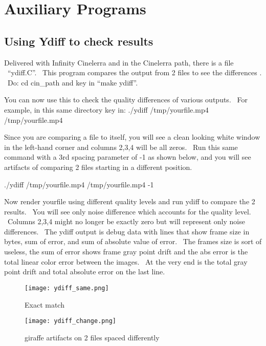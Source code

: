 \chapter{Auxiliary Programs}%
\label{cha:auxiliary_programs}
\section{Using Ydiff to check results}
\label{sec:Ydiff to check results}

Delivered with Infinity Cinelerra and in the Cinelerra path, there is a file \ {}``ydiff.C''. \ This program compares the output from 2 files to see the differences . \ Do: cd cin\_path and key in ``make ydiff''. 
\medskip

You can now use this to check the quality differences of various outputs. \ For example, in this same directory key in:
\hspace{2em}./ydiff /tmp/yourfile.mp4 /tmp/yourfile.mp4 
\medskip

Since you are comparing a file to itself, you will see a clean looking white window in the left-hand corner and columns 2,3,4 will be all zeros. \ Run this same command with a 3rd spacing parameter of {}-1 as shown below, and you will see artifacts of comparing 2 files starting in a different position.
\medskip

\hspace{2em}./ydiff /tmp/yourfile.mp4 /tmp/yourfile.mp4 -1
\medskip

Now render yourfile using different quality levels and run ydiff to compare the 2 results. \ You will see only noise difference which accounts for the quality level. \ Columns 2,3,4 might no longer be exactly zero but will represent only noise differences. \ The ydiff output is debug data with lines that show frame size in bytes, sum of error, and sum of absolute value of error. \ The frames size is sort of useless, the sum of error shows frame gray point drift and the abs error is the total linear color error between the images. \ At the very end is the total gray point drift and total absolute error on the last line.

{					%
\begin{figure}
	\captionsetup{justification=raggedright,singlelinecheck=false}
	\texttt{[image: ydiff\_same.png]}
	\caption{Exact match}
	\vspace{-9cm}
 	\hspace{0.4\linewidth}
	\captionsetup{justification=raggedleft,singlelinecheck=false}
	\texttt{[image: ydiff\_change.png]}
	\caption{{\textquotedbl}giraffe{\textquotedbl} artifacts on 2 files spaced differently}
\end{figure}
}
\clearpage

